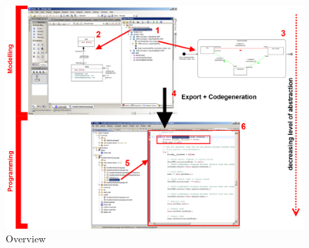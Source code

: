 \begin{figure}[htbp]
	\centering
  \includegraphics[width=1.1\textwidth]{../../org.moflon.doc.handbook.01_installation/4_projectSetup/modelingWithEA/ea_images/tafelbild}
	\caption{Overview}
	\label{fig:Overview}
\end{figure}


\clearpage